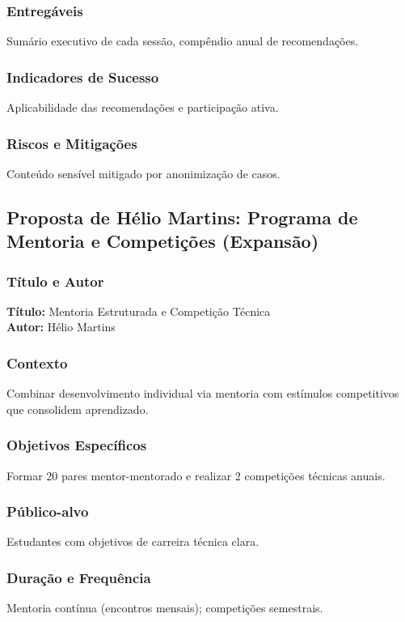 \documentclass[12pt,a4paper]{article}
\begin{document}
\subsubsection*{Entregáveis}
Sumário executivo de cada sessão, compêndio anual de recomendações.

\subsubsection*{Indicadores de Sucesso}
Aplicabilidade das recomendações e participação ativa.

\subsubsection*{Riscos e Mitigações}
Conteúdo sensível mitigado por anonimização de casos.

\subsection{Proposta de Hélio Martins: Programa de Mentoria e Competições (Expansão)}

\subsubsection*{Título e Autor}
\textbf{Título:} Mentoria Estruturada e Competição Técnica \\
\textbf{Autor:} Hélio Martins

\subsubsection*{Contexto}
Combinar desenvolvimento individual via mentoria com estímulos competitivos que consolidem aprendizado.

\subsubsection*{Objetivos Específicos}
Formar 20 pares mentor-mentorado e realizar 2 competições técnicas anuais.

\subsubsection*{Público-alvo}
Estudantes com objetivos de carreira técnica clara.

\subsubsection*{Duração e Frequência}
Mentoria contínua (encontros mensais); competições semestrais.
\end{document}
